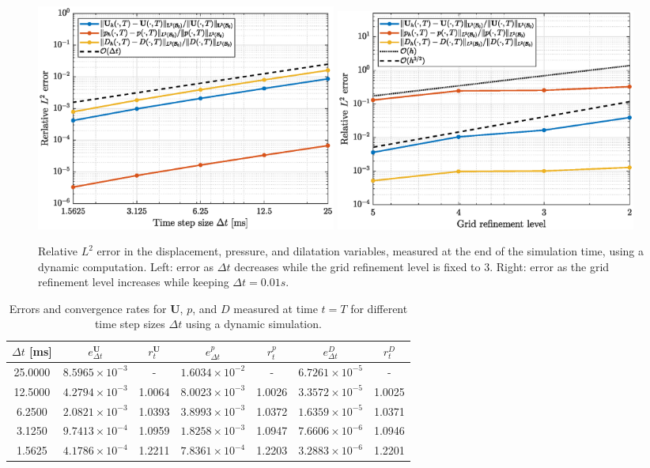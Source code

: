 \documentclass{sfuthesis}
\numberwithin{equation}{section}
\numberwithin{figure}{chapter}
\numberwithin{table}{chapter}
\theoremstyle{definition}
\def\*#1{{\mathbf{#1}}} %
\begin{document}
\begin{figure}
    \centering
    \includegraphics[width=0.48\textwidth]{convergence-study-time.eps}
    \includegraphics[width=0.48\textwidth]{convergence-study-space.eps}
    \caption{Relative $L^2$ error in the displacement, pressure, and dilatation variables, measured at the end of the simulation time, using a dynamic computation. Left: error as $\Delta t$ decreases while the grid refinement level is fixed to 3. Right: error as the grid refinement level increases while keeping $\Delta t = 0.01 \unit{s}$.\label{fig:convergence_dynamic}}
\end{figure}

\begin{table}
\centering
\small
\begin{tabular}{ccccccc}
\hline
$\Delta t$ [ms] &  $e_{\Delta t}^{\*U}$ & $r_{t}^\*U$ & $e_{\Delta t}^{p}$ & $r_{t}^p$  & $e_{\Delta t}^{D}$ & $r_{t}^D$  \\
\hline
25.0000  & $8.5965 \times 10^{-3}$ & -       & $1.6034 \times 10^{-2}$ & -       & $6.7261 \times 10^{-5}$ & - \\
12.5000  & $4.2794 \times 10^{-3}$ & 1.0064  & $8.0023 \times 10^{-3}$ & 1.0026  & $3.3572 \times 10^{-5}$ & 1.0025 \\
6.2500   & $2.0821 \times 10^{-3}$ & 1.0393  & $3.8993 \times 10^{-3}$ & 1.0372  & $1.6359 \times 10^{-5}$ & 1.0371 \\
3.1250   & $9.7413 \times 10^{-4}$ & 1.0959  & $1.8258 \times 10^{-3}$ & 1.0947  & $7.6606 \times 10^{-6}$ & 1.0946 \\
1.5625   & $4.1786 \times 10^{-4}$ & 1.2211  & $7.8361 \times 10^{-4}$ & 1.2203  & $3.2883 \times 10^{-6}$ & 1.2201 \\
\hline
\end{tabular}
\caption{Errors and convergence rates for $\*U$, $p$, and $D$ measured at time $t=T$ for different time step sizes $\Delta t$ using a dynamic simulation.\label{tab:errors_rates_time}}
\end{table}
\end{document}
